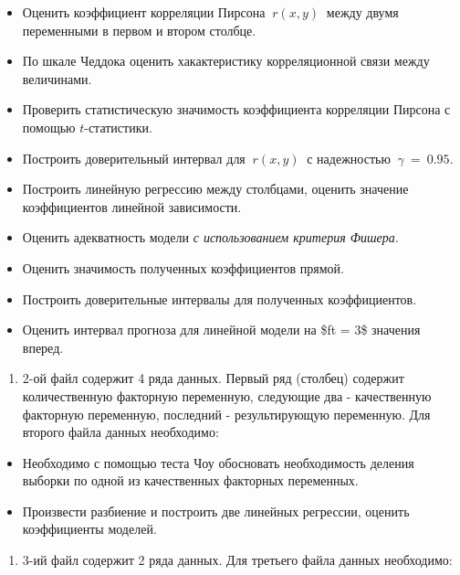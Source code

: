 \documentclass[
]{article}
\providecommand{\tightlist}{%
  \setlength{\itemsep}{0pt}\setlength{\parskip}{0pt}}
\begin{document}
\begin{itemize}
\item
  Оценить коэффициент корреляции Пирсона \(\ r(x, y)\ \) между двумя
  переменными в первом и втором столбце.
\item
  По шкале Чеддока оценить хакактеристику корреляционной связи между
  величинами.
\item
  Проверить статистическую значимость коэффициента корреляции Пирсона с
  помощью \(t\)-статистики.
\item
  Построить доверительный интервал для \(\ r(x, y)\ \) с надежностью
  \(\ \gamma\ = \ 0.95\).
\item
  Построить линейную регрессию между столбцами, оценить значение
  коэффициентов линейной зависимости.
\item
  Оценить адекватность модели \emph{с использованием критерия Фишера}.
\item
  Оценить значимость полученных коэффициентов прямой.
\item
  Построить доверительные интервалы для полученных коэффициентов.
\item
  Оценить интервал прогноза для линейной модели на \$ft = 3\$ значения
  вперед.
\end{itemize}

\begin{enumerate}
\def\labelenumi{\arabic{enumi}.}
\setcounter{enumi}{1}
\tightlist
\item
  2-ой файл содержит 4 ряда данных. Первый ряд (столбец) содержит
  количественную факторную переменную, следующие два - качественную
  факторную переменную, последний - результирующую переменную. Для
  второго файла данных необходимо:
\end{enumerate}

\begin{itemize}
\item
  Необходимо с помощью теста Чоу обосновать необходимость деления
  выборки по одной из качественных факторных переменных.
\item
  Произвести разбиение и построить две линейных регрессии, оценить
  коэффициенты моделей.
\end{itemize}

\begin{enumerate}
\def\labelenumi{\arabic{enumi}.}
\setcounter{enumi}{2}
\tightlist
\item
  3-ий файл содержит 2 ряда данных. Для третьего файла данных
  необходимо:
\end{enumerate}
\end{document}
